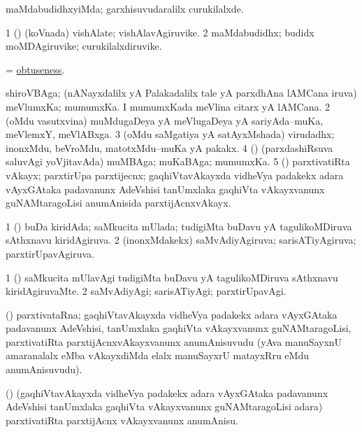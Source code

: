 \bentry
{}
\gl{\kirxvi}
\bmng
maMdabudidhxyiMda; garxhisuvudaralilx curukilalxde. 
\emng
\eentry

\bentry
{}
\gl{\nA}
\bmng
\bnum
\num{1} (\ga) (koVnada) vishAlate; vishAlavAgiruvike. 
\num{2} maMdabudidhx; budidx moMDAgiruvike; curukilalxdiruvike. 
\enum
\emng
\eentry

\bentry
{}
\gl{\nA}
\bmng
= \hyperlink{obtuseness}{obtuseness}. 
\emng
\eentry

\bentry
{}
\gl{\nA}
\bmng
\bnum
{} 
\banum
{} shiroVBAga; (nANayxdalilx yA Palakadalilx tale yA parxdhAna lAMCana iruva) meVlumxKa; mumumxKa. 
 I mumumxKada meVlina citarx yA lAMCana. 
\eanum
\numie
\num{2} (oMdu vasutxvina) muMdugaDeya yA meVlugaDeya yA sariyAda--muKa, meVlemxY, meVlABxga. 
\num{3} (oMdu saMgatiya yA satAyxMshada) virudadhx; inonxMdu, beVroMdu, matotxMdu--muKa yA pakakx. 
\num{4} (\rUpa) (parxdashiRsuva saluvAgi yoVjitavAda) muMBAga; muKaBAga; mumumxKa. 
\num{5} (\takaR) parxtivatiRta vAkayx; parxtirUpa parxtijecnx; gaqhiVtavAkayxda vidheVya padakekx adara vAyxGAtaka padavanunx AdeVshisi tanUmxlaka gaqhiVta vAkayxvanunx guNAMtaragoLisi anumAnisida parxtijAcnxvAkayx. 
\enum
\emng
\eentry

\bentry
{}
\gl{\gu}
\bmng
\bnum
\num{1} (\jiVvi) buDa kiridAda; saMkucita mUlada; tudigiMta buDavu yA tagulikoMDiruva sAthxnavu kiridAgiruva. 
\num{2} (inonxMdakekx) saMvAdiyAgiruva; sarisATiyAgiruva; parxtirUpavAgiruva. 
\enum
\emng
\eentry

\bentry
{}
\gl{\kirxvi}
\bmng
\bnum
\num{1} (\jiVvi) saMkucita mUlavAgi tudigiMta buDavu yA tagulikoMDiruva sAthxnavu kiridAgiruvaMte. 
\num{2} saMvAdiyAgi; sarisATiyAgi; parxtirUpavAgi. 
\enum
\emng
\eentry

\bentry
{}
\gl{\nA}
\bmng
(\takaR) parxtivataRna; gaqhiVtavAkayxda vidheVya padakekx adara vAyxGAtaka padavanunx AdeVshisi, tanUmxlaka gaqhiVta vAkayxvanunx guNAMtaragoLisi, parxtivatiRta parxtijAcnxvAkayxvanunx anumAnisuvudu (yAva manuSayxnU amaranalalx eMba vAkayxdiMda elalx manuSayxrU matayxRru eMdu anumAnisuvudu). 
\emng
\eentry

\bentry
{}
\gl{\sakirx}
\bmng
(\takaR) (gaqhiVtavAkayxda vidheVya padakekx adara vAyxGAtaka padavanunx AdeVshisi tanUmxlaka gaqhiVta vAkayxvanunx guNAMtaragoLisi adara) parxtivatiRta parxtijAcnx vAkayxvanunx anumAnisu. 
\emng
\eentry

